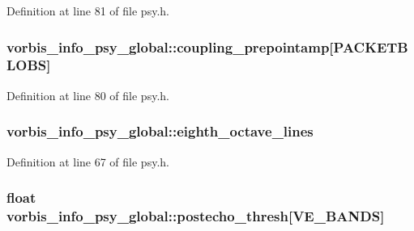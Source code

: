 Definition at line 81 of file psy.\+h.

\subsubsection[{\texorpdfstring{coupling\+\_\+prepointamp}{coupling_prepointamp}}]{ vorbis\+\_\+info\+\_\+psy\+\_\+global\+::coupling\+\_\+prepointamp\mbox{[}{\bf P\+A\+C\+K\+E\+T\+B\+L\+O\+BS}\mbox{]}}\hypertarget{structvorbis__info__psy__global_a42cf86f4d73118ff0e6af63cf1f96b1b}{}\label{structvorbis__info__psy__global_a42cf86f4d73118ff0e6af63cf1f96b1b}


Definition at line 80 of file psy.\+h.

\subsubsection[{\texorpdfstring{eighth\+\_\+octave\+\_\+lines}{eighth_octave_lines}}]{ vorbis\+\_\+info\+\_\+psy\+\_\+global\+::eighth\+\_\+octave\+\_\+lines}\hypertarget{structvorbis__info__psy__global_a88e8cf9fc8dd0de7562379558c4a1910}{}\label{structvorbis__info__psy__global_a88e8cf9fc8dd0de7562379558c4a1910}


Definition at line 67 of file psy.\+h.

\subsubsection[{\texorpdfstring{postecho\+\_\+thresh}{postecho_thresh}}]{\setlength{\rightskip}{0pt plus 5cm}float vorbis\+\_\+info\+\_\+psy\+\_\+global\+::postecho\+\_\+thresh\mbox{[}{\bf V\+E\+\_\+\+B\+A\+N\+DS}\mbox{]}}\hypertarget{structvorbis__info__psy__global_a9a413ec95a23be6ce0acb26684d1e13a}{}\label{structvorbis__info__psy__global_a9a413ec95a23be6ce0acb26684d1e13a}


